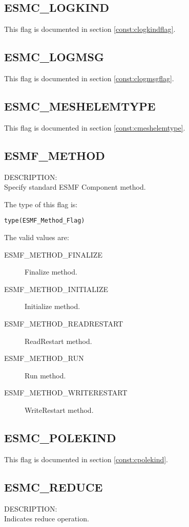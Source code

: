 \subsection{ESMC\_LOGKIND}
This flag is documented in section \ref{const:clogkindflag}.

\subsection{ESMC\_LOGMSG}
This flag is documented in section \ref{const:clogmsgflag}.

\subsection{ESMC\_MESHELEMTYPE}
This flag is documented in section \ref{const:cmeshelemtype}.

\subsection{ESMF\_METHOD}
\label{const:cmethod}

{\sf DESCRIPTION:\\}  
Specify standard ESMF Component method.

The type of this flag is:

{\tt type(ESMF\_Method\_Flag)}

The valid values are:
\begin{description}
\item [ESMF\_METHOD\_FINALIZE]
      Finalize method.
\item [ESMF\_METHOD\_INITIALIZE]
      Initialize method.
\item [ESMF\_METHOD\_READRESTART]
      ReadRestart method.
\item [ESMF\_METHOD\_RUN]
      Run method.
\item [ESMF\_METHOD\_WRITERESTART]
      WriteRestart method.
\end{description}

\subsection{ESMC\_POLEKIND}
This flag is documented in section \ref{const:cpolekind}.

\subsection{ESMC\_REDUCE}
\label{const:creduce}
{\sf DESCRIPTION:\\}
Indicates reduce operation.

